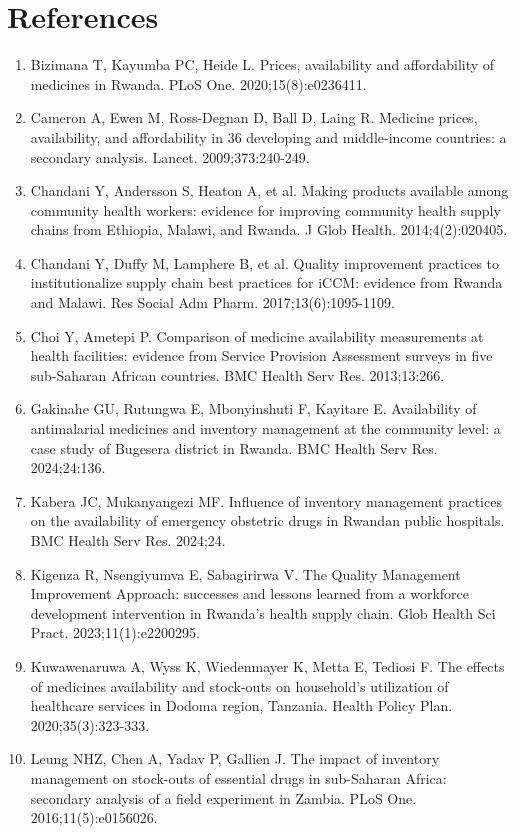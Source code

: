 \documentclass[10pt,a4paper]{report}
\begin{document}
\chapter*{References}
\begin{enumerate}[leftmargin=1.6em,itemsep=2pt]\small\item Bizimana T, Kayumba PC, Heide L. Prices, availability and affordability of medicines in Rwanda. PLoS One. 2020;15(8):e0236411.
\item Cameron A, Ewen M, Ross-Degnan D, Ball D, Laing R. Medicine prices, availability, and affordability in 36 developing and middle-income countries: a secondary analysis. Lancet. 2009;373:240-249.
\item Chandani Y, Andersson S, Heaton A, et al. Making products available among community health workers: evidence for improving community health supply chains from Ethiopia, Malawi, and Rwanda. J Glob Health. 2014;4(2):020405.
\item Chandani Y, Duffy M, Lamphere B, et al. Quality improvement practices to institutionalize supply chain best practices for iCCM: evidence from Rwanda and Malawi. Res Social Adm Pharm. 2017;13(6):1095-1109.
\item Choi Y, Ametepi P. Comparison of medicine availability measurements at health facilities: evidence from Service Provision Assessment surveys in five sub-Saharan African countries. BMC Health Serv Res. 2013;13:266.
\item Gakinahe GU, Rutungwa E, Mbonyinshuti F, Kayitare E. Availability of antimalarial medicines and inventory management at the community level: a case study of Bugesera district in Rwanda. BMC Health Serv Res. 2024;24:136.
\item Kabera JC, Mukanyangezi MF. Influence of inventory management practices on the availability of emergency obstetric drugs in Rwandan public hospitals. BMC Health Serv Res. 2024;24.
\item Kigenza R, Nsengiyumva E, Sabagirirwa V. The Quality Management Improvement Approach: successes and lessons learned from a workforce development intervention in Rwanda's health supply chain. Glob Health Sci Pract. 2023;11(1):e2200295.
\item Kuwawenaruwa A, Wyss K, Wiedenmayer K, Metta E, Tediosi F. The effects of medicines availability and stock-outs on household's utilization of healthcare services in Dodoma region, Tanzania. Health Policy Plan. 2020;35(3):323-333.
\item Leung NHZ, Chen A, Yadav P, Gallien J. The impact of inventory management on stock-outs of essential drugs in sub-Saharan Africa: secondary analysis of a field experiment in Zambia. PLoS One. 2016;11(5):e0156026.

\end{enumerate}
\end{document}
